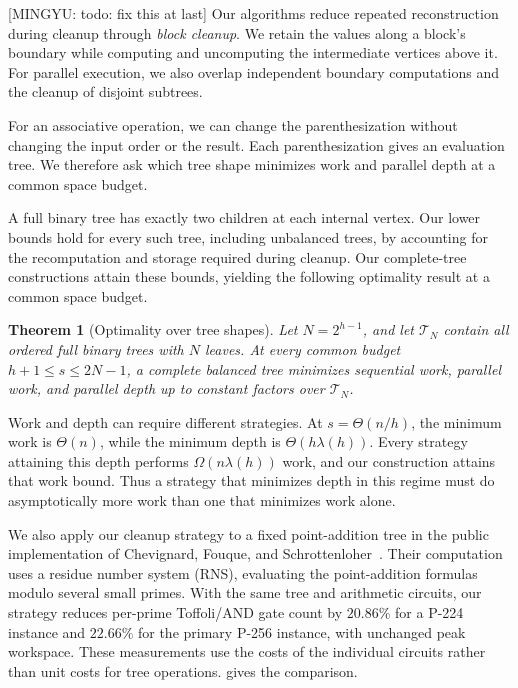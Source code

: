 \documentclass[11pt]{article}
\newtheorem{theorem}{Theorem}[section]
\theoremstyle{definition}
\theoremstyle{remark}
\newcommand{\mingyu}[1]{{\color{magenta}\footnotesize [MINGYU: #1]}} %
\begin{document}
\mingyu{todo: fix this at last}
Our algorithms reduce repeated reconstruction during cleanup through
\emph{block cleanup}. We retain the values along a block's boundary while
computing and uncomputing the intermediate vertices above it. For parallel
execution, we also overlap independent boundary computations and the
cleanup of disjoint subtrees.

For an associative operation, we can change the parenthesization
without changing the input order or the result.
Each parenthesization gives an evaluation tree.
We therefore ask which tree shape minimizes work and parallel
depth at a common space budget.

A full binary tree has exactly two children at each internal vertex.
Our lower bounds hold for every such tree, including unbalanced trees,
by accounting for the recomputation and storage required during cleanup.
Our complete-tree constructions attain these bounds, yielding the
following optimality result at a common space budget.

\begin{theorem}[Optimality over tree shapes]
\label{thm:main-shape}
Let $N=2^{h-1}$, and let $\mathcal T_N$ contain all ordered full binary trees with $N$ leaves. At every common budget $h+1\le s\le2N-1$, a complete balanced tree minimizes sequential work, parallel work, and parallel depth up to constant factors over $\mathcal T_N$.
\end{theorem}

Work and depth can require different strategies. At $s=\Theta(n/h)$, the minimum work is $\Theta(n)$, while the minimum depth is $\Theta(h\lambda(h))$. Every strategy attaining this depth performs $\Omega(n\lambda(h))$ work, and our construction attains that work bound. Thus a strategy that minimizes depth in this regime must do asymptotically more work than one that minimizes work alone.

We also apply our cleanup strategy to a fixed point-addition tree in the public implementation of Chevignard, Fouque, and Schrottenloher~\cite{CFS2026}. Their computation uses a residue number system (RNS), evaluating the point-addition formulas modulo several small primes. With the same tree and arithmetic circuits, our strategy reduces per-prime Toffoli/AND gate count by $20.86\%$ for a P-224 instance and $22.66\%$ for the primary P-256 instance, with unchanged peak workspace. These measurements use the costs of the individual circuits rather than unit costs for tree operations.  gives the comparison.
\end{document}
